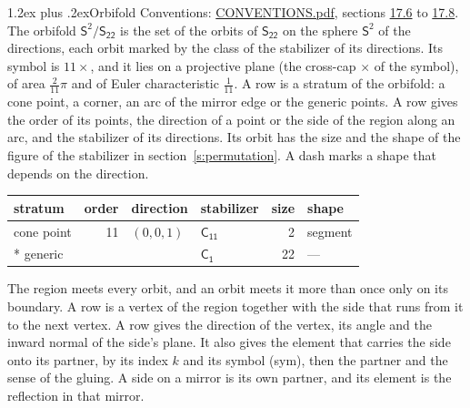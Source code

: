 \documentclass[10pt,a4paper]{article}
\makeatletter
\renewcommand\section{\@startsection{section}{1}{\z@}{-3ex plus -1ex minus -.2ex}%
  {1.2ex plus .2ex}{\normalfont\large\sffamily\bfseries\color{parttitle}}}
\numberwithin{equation}{section}
\newcommand{\grp}[1]{\mathsf{#1}}
\newcommand{\orbname}[1]{#1}
\newcommand{\dirvec}[3]{(#1, #2, #3)}
\newcommand{\twosphere}{\mathsf{S}^{2}}
\makeatother
\begin{document}
\section{Orbifold}\label{s:orbifold}
Conventions: \href{../../CONVENTIONS.pdf}{CONVENTIONS.pdf}, sections \href{../../CONVENTIONS.pdf\#conv.17.6}{17.6} to \href{../../CONVENTIONS.pdf\#conv.17.8}{17.8}.
The orbifold $\twosphere/\grp{S_{22}}$ is the set of the orbits of $\grp{S_{22}}$ on the sphere $\twosphere$ of the directions, each orbit marked by the class of the stabilizer of its directions. Its symbol is $\orbname{11{\times}}$, and it lies on a projective plane (the cross-cap ${\times}$ of the symbol), of area $\tfrac{2}{11}\pi$ and of Euler characteristic $\tfrac{1}{11}$.
\leavevmode\label{n:head.stratum}\label{n:head.order.point}\label{n:head.direction}\label{n:head.stabilizer}\label{n:head.size.orbit}\label{n:head.shape}A row is a stratum of the orbifold: a cone point, a corner, an arc of the mirror edge or the generic points. A row gives the order of its points, the direction of a point or the side of the region along an arc, and the stabilizer of its directions. Its orbit has the size and the shape of the figure of the stabilizer in section~\ref{s:permutation}. A dash marks a shape that depends on the direction.
{\small\setlength{\tabcolsep}{4pt}\begin{longtable}{@{}lrllrl@{}}\toprule
stratum & order & direction & stabilizer & size & shape\\\midrule\endhead
\bottomrule\endfoot\endlastfoot
cone point & 11 & $\dirvec{0}{0}{1}$ & \href{C11.pdf}{$\grp{C_{11}}$} & 2 & segment\\*
generic &  &  & \href{C1.pdf}{$\grp{C_{1}}$} & 22 & ---\\
\bottomrule\end{longtable}}
\leavevmode\label{n:head.vertex.region}\label{n:head.angle}\label{n:head.normal.side}\label{n:head.partner}\label{n:head.sense}The region meets every orbit, and an orbit meets it more than once only on its boundary. A row is a vertex of the region together with the side that runs from it to the next vertex. A row gives the direction of the vertex, its angle and the inward normal of the side's plane. It also gives the element that carries the side onto its partner, by its index $k$ and its symbol (sym), then the partner and the sense of the gluing. A side on a mirror is its own partner, and its element is the reflection in that mirror.
\end{document}
